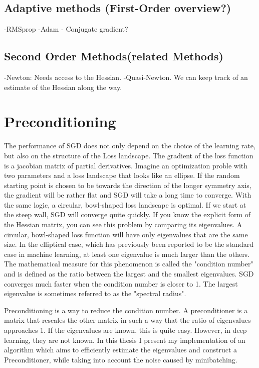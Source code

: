 \documentclass[twoside,12pt,a4paper]{report}
\begin{document}
\subsection{Adaptive methods (First-Order overview?)}
-RMSprop
-Adam
- Conjugate gradient?

\subsection{Second Order Methods(related Methods)}
-Newton: Needs access to the Hessian.
-Quasi-Newton.
We can keep track of an estimate of the Hessian along the way.

\section{Preconditioning}
The performance of SGD does not only depend on the choice of the learning rate, but also on the structure of the Loss landscape. The gradient of the loss function is a jacobian matrix of partial derivatives. Imagine an optimization proble with two parameters and a loss landscape that looks like an ellipse. If the random starting point is chosen to be towards the direction of the longer symmetry axis, the gradient will be rather flat and SGD will take a long time to converge. With the same logic, a circular, bowl-shaped loss landscape is optimal.
If we start at the steep wall, SGD will converge quite quickly. If you know the explicit form of the Hessian matrix, you can see this problem by comparing its eigenvalues. A circular, bowl-shaped loss function will have only eigenvalues that are the same size. In the elliptical case, which has previously been reported to be the standard case in machine learning, at least one eigenvalue is much larger than the others.
The mathematical measure for this phenomenon is called the "condition number" and is defined as the ratio between the largest and the smallest eigenvalues. SGD converges much faster when the condition number is closer to 1. The largest eigenvalue is sometimes referred to as the "spectral radius".

Preconditioning is a way to reduce the condition number. A preconditioner is a matrix that rescales the other matrix in such a way that the ratio of eigenvalues approaches 1.
If the eigenvalues are known, this is quite easy. However, in deep learning, they are not known. In this thesis I present my implementation of an algorithm which aims to efficiently estimate the eigenvalues and construct a Preconditioner, while taking into account the noise caused by minibatching.
\end{document}
